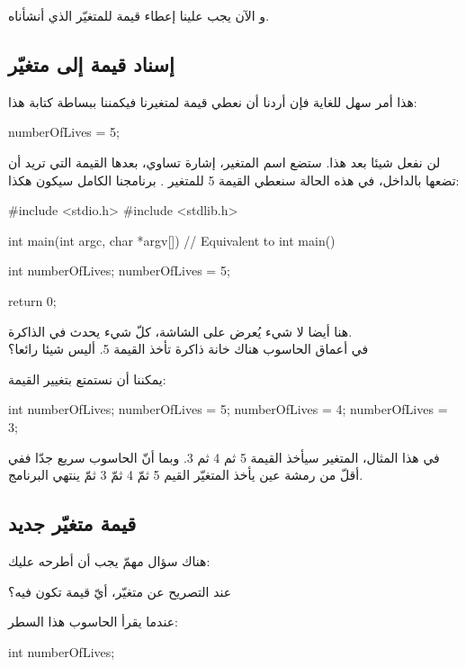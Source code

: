 و الآن يجب علينا إعطاء قيمة للمتغيّر الذي أنشأناه.

\subsection{إسناد قيمة إلى متغيّر}
هذا أمر سهل للغاية فإن أردنا أن نعطي قيمة لمتغيرنا
فيكمننا ببساطة كتابة هذا:

\begin{Csource}
numberOfLives = 5;
\end{Csource}

لن نفعل شيئا بعد هذا. ستضع اسم المتغير، إشارة تساوي، بعدها القيمة التي تريد أن تضعها بالداخل، في هذه الحالة سنعطي القيمة 5 للمتغير
.
برنامجنا الكامل سيكون هكذا:

\begin{Csource}
#include <stdio.h>
#include <stdlib.h>

int main(int argc, char *argv[]) // Equivalent to int main()
{
  int numberOfLives;
  numberOfLives = 5;

  return 0;
}
\end{Csource}

هنا أيضا لا شيء يُعرض على الشاشة، كلّ شيء يحدث في الذاكرة.\\
في أعماق الحاسوب هناك خانة ذاكرة تأخذ القيمة 5. أليس شيئا رائعا؟

يمكننا أن نستمتع بتغيير القيمة:

\begin{Csource}
int numberOfLives;
numberOfLives = 5;
numberOfLives = 4;
numberOfLives = 3;
\end{Csource}

في هذا المثال، المتغير سيأخذ القيمة 5 ثم 4 ثم 3. وبما أنّ الحاسوب سريع جدّا ففي أقلّ من رمشة عين يأخذ المتغيّر القيم 5 ثمّ 4 ثمّ 3 ثمّ ينتهي البرنامج.

\subsection{قيمة متغيّر جديد}

هناك سؤال مهمّ يجب أن أطرحه عليك:

\begin{question}
  عند التصريح عن متغيّر، أيّ قيمة تكون فيه؟
\end{question}

عندما يقرأ الحاسوب هذا السطر:

\begin{Csource}
int numberOfLives;
\end{Csource}

